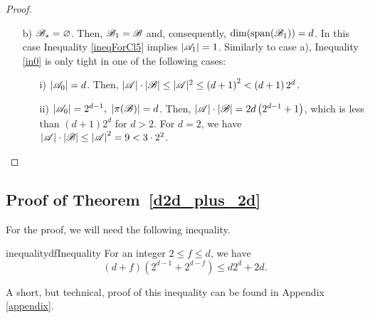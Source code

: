 \begin{proof}
\begin{enumerate}
\begin{enumerate}
\begin{enumerate}
                \item[ii)] $\left|\aaa_0\right|=d$. Then, since $\left|\bb\right|\leq\left|\aaa\right|=2d$,  $\left|\aaa\right|\cdot\left|\bb\right|\leq4d^2$, which is less than $(d+1)2^d$ for $d\geq4$. For $d=3$, the inequality $\left|\bb\right|\cdot\left|\aaa\right|\leq32$ cannot yield equality since $\left|\aaa\right|=6$. Finally, if $d=2$ then $|\aaa|=4$, thus $\aaa$ is affinely isomorphic to a square  and $|\aaa|\cdot|\bb| = 3 \cdot 2^2$ only if $|\bb|=3=d+1$.
            \end{enumerate}
            \item [b)] ${\mathscr{B}}_*=\varnothing$. Then, ${\mathscr{B}}_1 = {\mathscr{B}}$ and, consequently, $\operatorname{dim}(\operatorname{span}({\mathscr{B}}_1))=d$. In this case Inequality \ref{ineqForCl5} implies $|{\mathscr{A}}_1|=1$.
            Similarly to case a), Inequality \ref{in0} is only tight in one of the following cases:
            \begin{enumerate}
                \item[i)]$\left|\aaa_0\right|=d$. Then, $|{\mathscr{A}}|\cdot|{\mathscr{B}}| \leq |{\mathscr{A}}|^2 \leq \left(d+1\right)^2<\left(d+1\right)2^d$.
                \item[ii)]$\left|{\mathscr{A}}_0\right|=2^{d-1}\text{, }\left|\pi({\mathscr{B}})\right|=d$. Then, $\left|{\mathscr{A}}\right|\cdot\left|{\mathscr{B}}\right|=2d\left(2^{d-1}+1\right)$, which is less than $(d+1)2^d$ for $d>2$. For $d=2$, we have $\left|{\mathscr{A}}\right|\cdot\left|{\mathscr{B}}\right|\leq\left|{\mathscr{A}}\right|^2=9<3\cdot2^2$.
            \end{enumerate}
        \end{enumerate}
    \end{enumerate}
\end{proof}

\subsection{Proof of Theorem~\ref{d2d_plus_2d}}\label{sec32}
For the proof, we  will need the following inequality. 

\begin{restatable}{inequality}{dfInequality}\label{in2}
    For an integer $2\leq f\leq d$, we have \[(d+f)(2^{d-1}+2^{d-f})\leq d2^d + 2d.\]
\end{restatable}

\noindent 
A short, but technical, proof of this inequality can be found in Appendix \ref{appendix}. 

